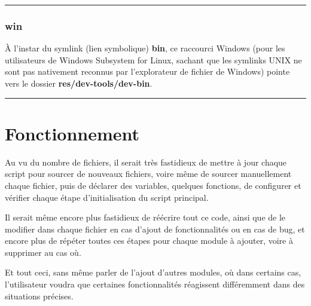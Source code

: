 \documentclass[a4paper,10pt]{article}
\begin{document}
\color{sec3}\par\noindent\rule{\textwidth}{0.4pt}\color{text}

\color{sec3}
\subsubsection{win}\color{text}

\begin{justify}
    À l'instar du symlink (lien symbolique) \textbf{\color{path}bin}, ce raccourci Windows (pour les utilisateurs de Windows Subsystem for Linux, sachant que les symlinks UNIX ne sont pas nativement reconnus par l'explorateur de fichier de Windows) pointe vers le dossier \textbf{\color{path}res/dev-tools/dev-bin}.
\end{justify}





\color{sec1}\par\noindent\rule{\textwidth}{0.4pt}\color{text}

\color{sec1}
\section{Fonctionnement}\color{text}

\begin{justify}
    Au vu du nombre de fichiers, il serait très fastidieux de mettre à jour chaque script pour sourcer de nouveaux fichiers, voire même de sourcer manuellement chaque fichier, puis de déclarer des variables, quelques fonctions, de configurer et vérifier chaque étape d'initialisation du script principal.
\end{justify}

\begin{justify}
    Il serait même encore plus fastidieux de réécrire tout ce code, ainsi que de le modifier dans chaque fichier en cas d'ajout de fonctionnalités ou en cas de bug, et encore plus de répéter toutes ces étapes pour chaque module à ajouter, voire à supprimer au cas où.
\end{justify}

\begin{justify}
    Et tout ceci, sans même parler de l'ajout d'autres modules, où dans certains cas, l'utilisateur voudra que certaines fonctionnalités réagissent différemment dans des situations précises.
\end{justify}
\end{document}
